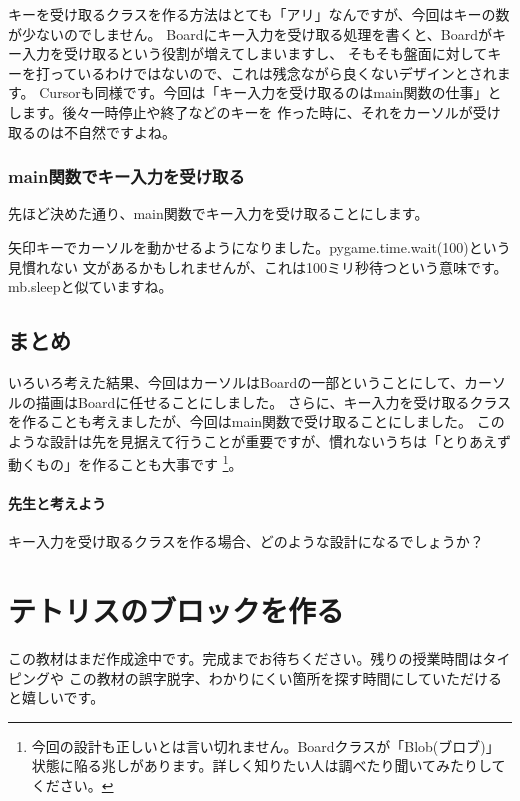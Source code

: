 \documentclass[12pt, a4paper, dvipdfmx]{book}
\begin{document}
キーを受け取るクラスを作る方法はとても「アリ」なんですが、今回はキーの数が少ないのでしません。
Boardにキー入力を受け取る処理を書くと、Boardがキー入力を受け取るという役割が増えてしまいますし、
そもそも盤面に対してキーを打っているわけではないので、これは残念ながら良くないデザインとされます。
Cursorも同様です。今回は「キー入力を受け取るのはmain関数の仕事」とします。後々一時停止や終了などのキーを
作った時に、それをカーソルが受け取るのは不自然ですよね。

\subsection{main関数でキー入力を受け取る}
先ほど決めた通り、main関数でキー入力を受け取ることにします。

矢印キーでカーソルを動かせるようになりました。pygame.time.wait(100)という見慣れない
文があるかもしれませんが、これは100ミリ秒待つという意味です。mb.sleepと似ていますね。

\section{まとめ}
いろいろ考えた結果、今回はカーソルはBoardの一部ということにして、カーソルの描画はBoardに任せることにしました。
さらに、キー入力を受け取るクラスを作ることも考えましたが、今回はmain関数で受け取ることにしました。
このような設計は先を見据えて行うことが重要ですが、慣れないうちは「とりあえず動くもの」を作ることも大事です
\footnote{今回の設計も正しいとは言い切れません。Boardクラスが「Blob(ブロブ)」状態に陥る兆しがあります。詳しく知りたい人は調べたり聞いてみたりしてください。}。

\subsubsection{先生と考えよう}
キー入力を受け取るクラスを作る場合、どのような設計になるでしょうか？

\chapter{テトリスのブロックを作る}
この教材はまだ作成途中です。完成までお待ちください。残りの授業時間はタイピングや
この教材の誤字脱字、わかりにくい箇所を探す時間にしていただけると嬉しいです。
\end{document}
